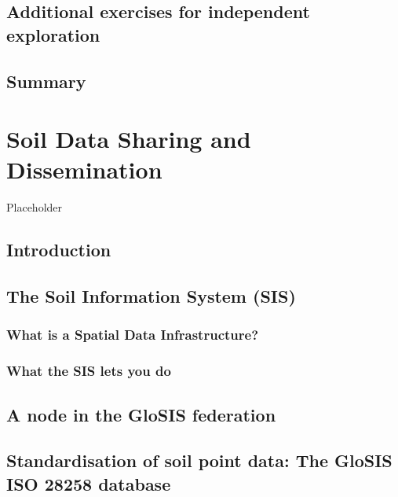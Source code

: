 \documentclass[
  10pt,
  b5paper,
  oneside]{book}
\begin{document}
\section{Additional exercises for independent exploration}\label{additional-exercises-for-independent-exploration}

\section{Summary}\label{summary}

\chapter{Soil Data Sharing and Dissemination}\label{soil-data-sharing-and-dissemination}

Placeholder

\section{Introduction}\label{introduction-2}

\section{The Soil Information System (SIS)}\label{the-soil-information-system-sis}

\subsection{What is a Spatial Data Infrastructure?}\label{what-is-a-spatial-data-infrastructure}

\subsection{What the SIS lets you do}\label{what-the-sis-lets-you-do}

\section{A node in the GloSIS federation}\label{glosis-node}

\section{Standardisation of soil point data: The GloSIS ISO 28258 database}\label{standardisation-of-soil-point-data-the-glosis-iso-28258-database}
\end{document}
